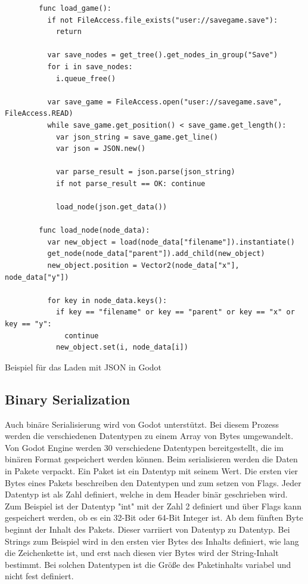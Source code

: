 \begin{listing}[htp]
    \begin{verbatim}
        func load_game():
          if not FileAccess.file_exists("user://savegame.save"):
            return

          var save_nodes = get_tree().get_nodes_in_group("Save")
          for i in save_nodes:
            i.queue_free()

          var save_game = FileAccess.open("user://savegame.save", FileAccess.READ)
          while save_game.get_position() < save_game.get_length():
            var json_string = save_game.get_line()
            var json = JSON.new()

            var parse_result = json.parse(json_string)
            if not parse_result == OK: continue

            load_node(json.get_data())

        func load_node(node_data):
          var new_object = load(node_data["filename"]).instantiate()
          get_node(node_data["parent"]).add_child(new_object)
          new_object.position = Vector2(node_data["x"], node_data["y"])

          for key in node_data.keys():
            if key == "filename" or key == "parent" or key == "x" or key == "y":
              continue
            new_object.set(i, node_data[i])
    \end{verbatim}
    \caption{Beispiel für das Laden mit JSON in Godot\cite{godotengineSavingGames}}
    \label{lst:godotJsonLoad}
\end{listing} 

\subsection{Binary Serialization}
Auch binäre Serialisierung wird von Godot unterstützt. Bei diesem Prozess werden die verschiedenen Datentypen zu einem Array von Bytes umgewandelt. Von Godot Engine werden 30 verschiedene Datentypen bereitgestellt, die im binären Format gespeichert werden können. Beim serialisieren werden die Daten in Pakete verpackt. Ein Paket ist ein Datentyp mit seinem Wert. Die ersten vier Bytes eines Pakets beschreiben den Datentypen und zum setzen von Flags. Jeder Datentyp ist als Zahl definiert, welche in dem Header binär geschrieben wird. Zum Beispiel ist der Datentyp "int" mit der Zahl 2 definiert und über Flags kann gespeichert werden, ob es ein 32-Bit oder 64-Bit Integer ist. Ab dem fünften Byte beginnt der Inhalt des Pakets. Dieser varriiert von Datentyp zu Datentyp. Bei Strings zum Beispiel wird in den ersten vier Bytes des Inhalts definiert, wie lang die Zeichenkette ist, und erst nach diesen vier Bytes wird der String-Inhalt bestimmt. Bei solchen Datentypen ist die Größe des Paketinhalts variabel und nicht fest definiert.\cite{godotengineBinarySerialization}

